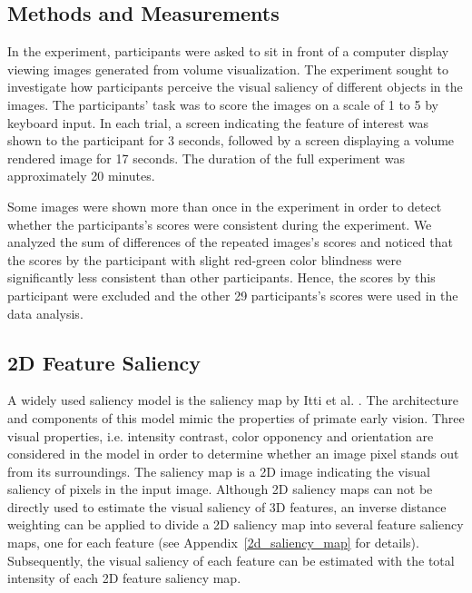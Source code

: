 \subsection{Methods and Measurements}
In the experiment, participants were asked to sit in front of a computer display viewing images generated from volume visualization. The experiment sought to investigate how participants perceive the visual saliency of different objects in the images. The participants' task was to score the images on a scale of 1 to 5 by keyboard input.
In each trial, a screen indicating the feature of interest was shown to the participant for 3 seconds, followed by a screen displaying a volume rendered image for 17 seconds.
The duration of the full experiment was approximately 20 minutes.

Some images were shown more than once in the experiment in order to detect whether the participants's scores were consistent during the experiment. We analyzed the sum of differences of the repeated images's scores and noticed that the scores by the participant with slight red-green color blindness were significantly less consistent than other participants.
Hence, the scores by this participant were excluded and the other 29 participants's scores were used in the data analysis.

\subsection{2D Feature Saliency \label{2d_feature_saliency}}
A widely used saliency model is the saliency map by Itti et al. \cite{itti_model_1998}.
The architecture and components of this model mimic the properties of primate early vision.
Three visual properties, i.e. intensity contrast, color opponency and orientation are considered in the model in order to determine whether an image pixel stands out from its surroundings.
The saliency map is a 2D image indicating the visual saliency of pixels in the input image. Although 2D saliency maps can not be directly used to estimate the visual saliency of 3D features, an inverse distance weighting \cite{shepard_two-dimensional_1968} can be applied to divide a 2D saliency map into several feature saliency maps, one for each feature (see Appendix~\ref{2d_saliency_map} for details). Subsequently, the visual saliency of each feature can be estimated with the total intensity of each 2D feature saliency map. 

